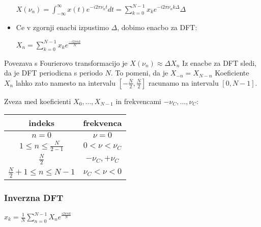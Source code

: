 \documentclass{article}
\begin{document}
\begin{multicols}{4}
\begin{itemize}
        \begin{center}
            \begin{math}
                X(\nu_n) = \int_{-\infty}^{\infty} x(t) e^{-i2 \pi \nu_n t} dt = \sum^{N-1}_{k=0} x_k e^{-i2 \pi \nu_n k \Delta} \Delta
            \end{math}
        \end{center}
    \item Ce v zgornji enacbi izpustimo $\Delta$, dobimo enacbo za DFT:
        \begin{center}
            \begin{math}
                X_n = \sum_{k=0}^{N-1} x_k e^{\frac{-i2 \pi n k}{N}}
            \end{math}
        \end{center}
\end{itemize}

Povezava s Fourierovo transformacijo je $X(\nu_n) \approx \Delta X_n$
Iz enacbe za DFT sledi, da je DFT periodicna s periodo $N$. To pomeni, da je $X_{-n} = X_{N-n}$
Koeficiente $X_n$ lahko zato namesto na intervalu $[-\frac{N}{2}, \frac{N}{2}]$ racunamo na
intervalu $[0, N - 1]$.

Zveza med koeficienti $X_0, \dots, X_{N-1}$ in frekvencami $- \nu_C, \dots, \nu_C$:
\begin{center}
    \begin{tabular}{ cc } 
        indeks & frekvenca \\
        \hline
            $n = 0$                             &  $\nu = 0$ \\
            $1 \leq n \leq \frac{N}{2-1}$       &  $0 < \nu < \nu_C$ \\
            $\frac{N}{2}$                       &  $-\nu_C, + \nu_C$ \\
            $\frac{N}{2} + 1 \leq n \leq N - 1$ &  $\nu_C < \nu < 0$ \\
        \hline
    \end{tabular}
\end{center}

\subsubsection{Inverzna DFT}
\begin{center}
    \begin{math}
        x_k = \frac{1}{N} \sum_{n=0}^{N-1} X_{n}e^{\frac{i2 \pi n k}{N}}
    \end{math}
\end{center}


\end{multicols}
\end{document}
